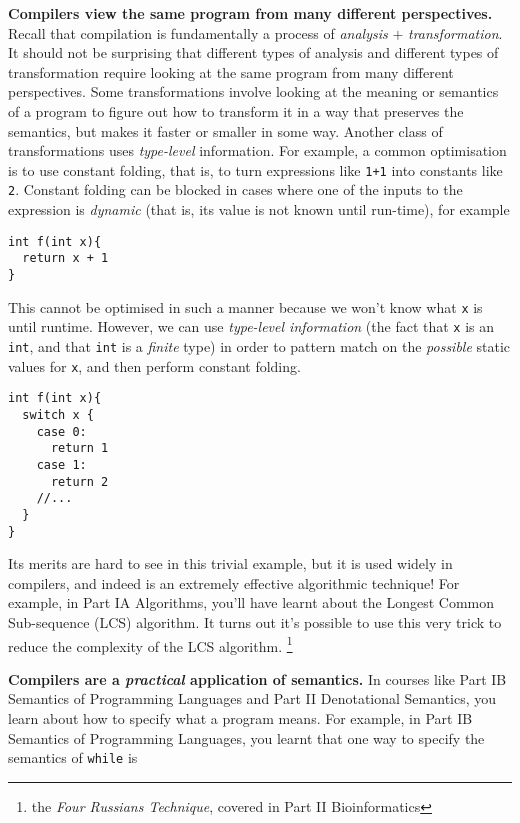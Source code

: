 \textbf{Compilers view the same program from many different perspectives.} Recall that compilation is fundamentally a process of \textit{analysis} $+$ \textit{transformation}. It should not be surprising that different types of analysis and different types of transformation require looking at the same program from many different perspectives. Some transformations involve looking at the meaning or semantics of a program to figure out how to transform it in a way that preserves the semantics, but makes it faster or smaller in some way. Another class of transformations uses \emph{type-level} information. For example, a common optimisation is to use constant folding, that is, to turn expressions like \texttt{1+1} into constants like \texttt{2}. Constant folding can be blocked in cases where one of the inputs to the expression is \emph{dynamic} (that is, its value is not known until run-time), for example \label{content:the-trick}

\begin{verbatim}
int f(int x){
  return x + 1
}
\end{verbatim}
This cannot be optimised in such a manner because we won't know what \texttt{x} is until runtime. However, we can use \emph{type-level information} (the fact that \texttt{x} is an \texttt{int}, and that \texttt{int} is a \emph{finite} type) in order to pattern match on the \emph{possible} static values for \texttt{x}, and then perform constant folding. 

\begin{verbatim}
int f(int x){
  switch x {
    case 0:
      return 1
    case 1:
      return 2
    //...
  }
}
\end{verbatim}
Its merits are hard to see in this trivial example, but it is used widely in compilers, and indeed is an extremely effective algorithmic technique! For example, in {\sffamily Part IA Algorithms}, you'll have learnt about the Longest Common Sub-sequence (LCS) algorithm. It turns out it's possible to use this very trick to reduce the complexity of the LCS algorithm. \footnote{the \emph{Four Russians Technique}, covered in {\sffamily Part II Bioinformatics}}

\textbf{Compilers are a \emph{practical} application of semantics.} In courses like {\sffamily Part IB Semantics of Programming Languages} and {\sffamily Part II Denotational Semantics}, you learn about how to specify what a program means. For example, in {\sffamily Part IB Semantics of Programming Languages}, you learnt that one way to specify the semantics of \texttt{while} is 

